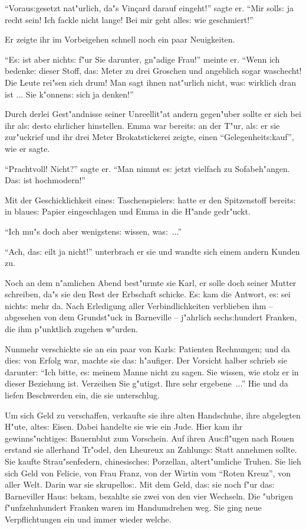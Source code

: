 \documentclass[oneside,12pt]{book}
\newcommand{\s}{s:}%
\begin{document}
"`Vorau{\s}gesetzt nat"urlich, da"s Vin\c{c}ard darauf eingeht!"'
sagte er. "`Mir soll{\s} ja recht sein! Ich fackle nicht lange!
Bei mir geht alle{\s} wie geschmiert!"'

Er zeigte ihr im Vorbeigehen schnell noch ein paar Neuigkeiten.

"`E{\s} ist aber nicht{\s} f"ur Sie darunter, gn"adige Frau!"'
meinte er. "`Wenn ich bedenke: dieser Stoff, da{\s} Meter zu drei
Groschen und angeblich sogar waschecht! Die Leute rei"sen sich
drum! Man sagt ihnen nat"urlich nicht, wa{\s} wirklich dran ist
... Sie k"onnen{\s} sich ja denken!"'

Durch derlei Gest"andnisse seiner Unreellit"at andern gegen"uber
sollte er sich bei ihr al{\s} desto ehrlicher hinstellen. Emma war
bereit{\s} an der T"ur, al{\s} er sie zur"uckrief und ihr drei
Meter Brokatstickerei zeigte, einen "`Gelegenheit{\s}kauf"', wie
er sagte.

"`Prachtvoll! Nicht?"' sagte er. "`Man nimmt e{\s} jetzt vielfach
zu Sofabeh"angen. Da{\s} ist hochmodern!"'

Mit der Geschicklichkeit eine{\s} Taschenspieler{\s} hatte er den
Spitzenstoff bereit{\s} in blaue{\s} Papier eingeschlagen und Emma
in die H"ande gedr"uckt.

"`Ich mu"s doch aber wenigsten{\s} wissen, wa{\s}~..."'

"`Ach, da{\s} eilt ja nicht!"' unterbrach er sie und wandte sich
einem andern Kunden zu.

Noch an dem n"amlichen Abend best"urmte sie Karl, er solle doch
seiner Mutter schreiben, da"s sie den Rest der Erbschaft schicke.
E{\s} kam die Antwort, e{\s} sei nicht{\s} mehr da. Nach
Erledigung aller Verbindlichkeiten verblieben ihm -- abgesehen von
dem Grundst"uck in Barneville -- j"ahrlich sech{\s}hundert
Franken, die ihm p"unktlich zugehen w"urden.

Nunmehr verschickte sie an ein paar von Karl{\s} Patienten
Rechnungen; und da die{\s} von Erfolg war, machte sie da{\s}
h"aufiger. Der Vorsicht halber schrieb sie darunter: "`Ich bitte,
e{\s} meinem Manne nicht zu sagen. Sie wissen, wie stolz er in
dieser Beziehung ist. Verzeihen Sie g"utigst. Ihre sehr
ergebene~..."' Hie und da liefen Beschwerden ein, die sie
unterschlug.

Um sich Geld zu verschaffen, verkaufte sie ihre alten Handschuhe,
ihre abgelegten H"ute, alte{\s} Eisen. Dabei handelte sie wie ein
Jude. Hier kam ihr gewinns"uchtige{\s} Bauernblut zum Vorschein.
Auf ihren Au{\s}fl"ugen nach Rouen erstand sie allerhand Tr"odel,
den Lheureux an Zahlung{\s} Statt annehmen sollte. Sie kaufte
Strau"senfedern, chinesische{\s} Porzellan, altert"umliche Truhen.
Sie lieh sich Geld von Felicie, von Frau Franz, von der Wirtin vom
"`Roten Kreuz"', von aller Welt. Darin war sie skrupello{\s}. Mit
dem Geld, da{\s} sie noch f"ur da{\s} Barneviller Hau{\s} bekam,
bezahlte sie zwei von den vier Wechseln. Die "ubrigen
f"unfzehnhundert Franken waren im Handumdrehen weg. Sie ging neue
Verpflichtungen ein und immer wieder welche.
\end{document}
